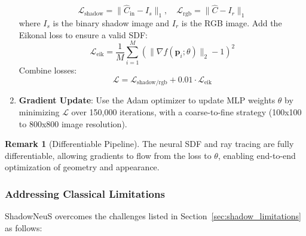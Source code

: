 \documentclass[12pt]{article}
\theoremstyle{definition}
\newtheorem{remark}{Remark}[subsection]
\begin{document}
\begin{enumerate}[label=\arabic*.]
        \[
        \mathcal{L}_{\text{shadow}} = \|\hat{C}_{\text{in}} - I_s\|_1, \quad \mathcal{L}_{\text{rgb}} = \|\hat{C} - I_r\|_1
        \]
        where \(I_s\) is the binary shadow image and \(I_r\) is the RGB image. Add the Eikonal loss to ensure a valid SDF:
        \[
        \mathcal{L}_{\text{eik}} = \frac{1}{M} \sum_{i=1}^M \left( \|\nabla f(\mathbf{p}_i; \theta)\|_2 - 1 \right)^2
        \]
        Combine losses:
        \[
        \mathcal{L} = \mathcal{L}_{\text{shadow/rgb}} + 0.01 \cdot \mathcal{L}_{\text{eik}}
        \]
    \item \textbf{Gradient Update}: Use the Adam optimizer to update MLP weights \(\theta\) by minimizing \(\mathcal{L}\) over 150,000 iterations, with a coarse-to-fine strategy (100x100 to 800x800 image resolution).
\end{enumerate}

\begin{remark}[Differentiable Pipeline]
The neural SDF and ray tracing are fully differentiable, allowing gradients to flow from the loss to \(\theta\), enabling end-to-end optimization of geometry and appearance.
\end{remark}

\subsubsection{Addressing Classical Limitations} \label{sec:address_limitations}

ShadowNeuS overcomes the challenges listed in Section~\ref{sec:shadow_limitations} as follows:
\end{document}
